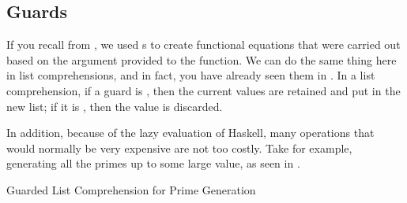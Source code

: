 \subsection{Guards}\label{subsec:List_Comprehension_Guards}
If you recall from , we used s to create functional equations that were carried out based on the argument provided to the function.
We can do the same thing here in list comprehensions, and in fact, you have already seen them in .
In a list comprehension, if a guard is , then the current values are retained and put in the new list; if it is , then the value is discarded.

In addition, because of the lazy evaluation of Haskell, many operations that would normally be very expensive are not too costly.
Take for example, generating all the primes up to some large value, as seen in .
\begin{listing}[h!tbp]
\caption{Guarded List Comprehension for Prime Generation}
\label{lst:List_Comprehension_Guards}
\end{listing}

